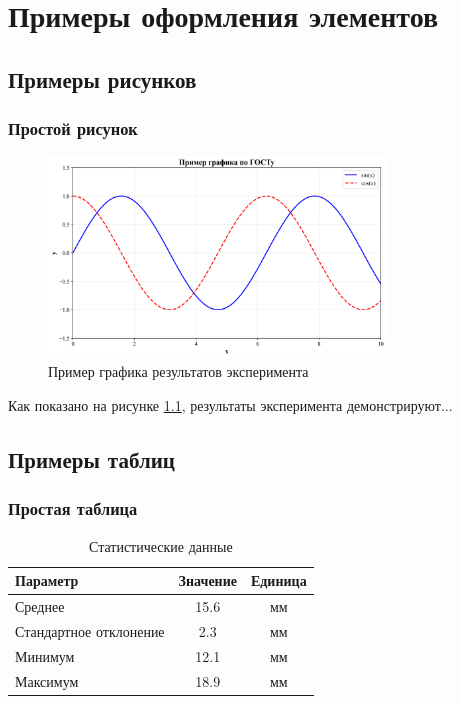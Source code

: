 \chapter{Примеры оформления элементов}

\section{Примеры рисунков}

\subsection{Простой рисунок}

\begin{figure}[H]
\centering
\includegraphics[width=0.8\textwidth]{images/example_plot.png}
\caption{Пример графика результатов эксперимента}
\label{fig:example_plot}
\end{figure}

Как показано на рисунке \ref{fig:example_plot}, результаты эксперимента демонстрируют...

\section{Примеры таблиц}

\subsection{Простая таблица}

\begin{table}[H]
\centering
\caption{Статистические данные}
\label{tab:statistics}
\begin{tabular}{|l|c|c|}
\hline
\textbf{Параметр} & \textbf{Значение} & \textbf{Единица} \\
\hline
Среднее & 15.6 & мм \\
Стандартное отклонение & 2.3 & мм \\
Минимум & 12.1 & мм \\
Максимум & 18.9 & мм \\
\hline
\end{tabular}
\end{table}

